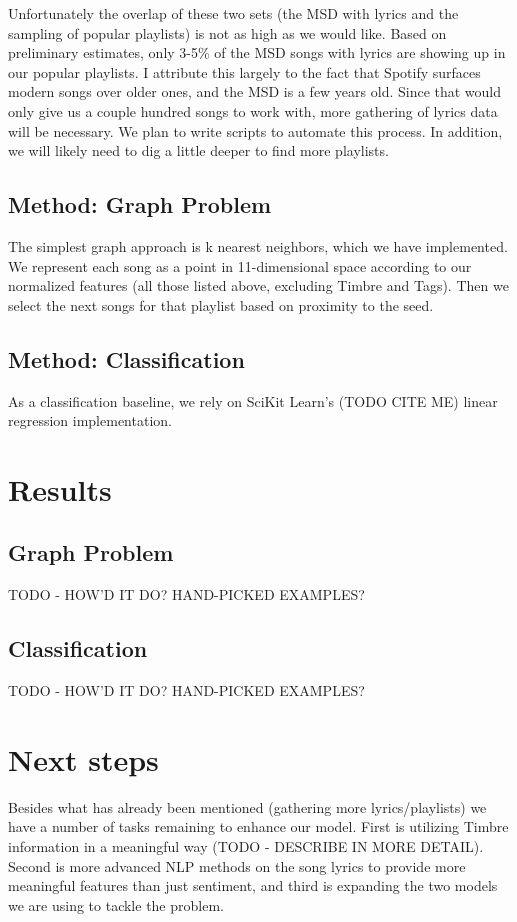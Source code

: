 \documentclass[10pt,journal,compsoc]{IEEEtran}
\begin{document}
Unfortunately the overlap of these two sets (the MSD with lyrics and the sampling of popular playlists) is not as high as we would like. Based on preliminary estimates, only 3-5\% of the MSD songs with lyrics are showing up in our popular playlists. I attribute this largely to the fact that Spotify surfaces modern songs over older ones, and the MSD is a few years old. Since that would only give us a couple hundred songs to work with, more gathering of lyrics data will be necessary. We plan to write scripts to automate this process. In addition, we will likely need to dig a little deeper to find more playlists.

\subsection{Method: Graph Problem}
The simplest graph approach is k nearest neighbors, which we have implemented. We represent each song as a point in 11-dimensional space according to our normalized features (all those listed above, excluding Timbre and Tags). Then we select the next songs for that playlist based on proximity to the seed.

\subsection{Method: Classification}
As a classification baseline, we rely on SciKit Learn's (TODO CITE ME) linear regression implementation.

\section{Results}

\subsection{Graph Problem}
TODO - HOW'D IT DO? HAND-PICKED EXAMPLES?

\subsection{Classification}
TODO - HOW'D IT DO? HAND-PICKED EXAMPLES?

\section{Next steps}
Besides what has already been mentioned (gathering more lyrics/playlists) we have a number of tasks remaining to enhance our model. First is utilizing Timbre information in a meaningful way (TODO - DESCRIBE IN MORE DETAIL). Second is more advanced NLP methods on the song lyrics to provide more meaningful features than just sentiment, and third is expanding the two models we are using to tackle the problem.
\end{document}
